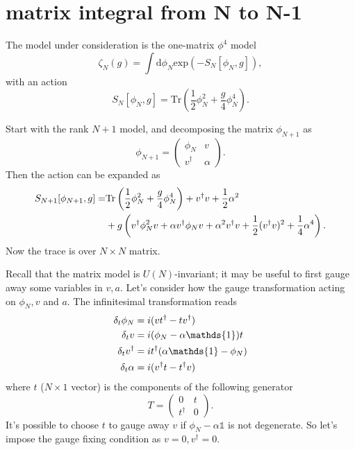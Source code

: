 \section{matrix integral from N to N-1}

The model under consideration is the one-matrix $\phi^4$ model
\begin{equation}
    \zeta_N(g) = \int \mathrm{d}\phi_N \mathrm{exp}(-S_N[\phi_N,g]),
\end{equation}
with an action
\begin{equation}
    S_N[\phi_N,g] = \mathrm{Tr} (\frac{1}{2}\phi_N^2 + \frac{g}{4}\phi_N^4).
\end{equation}

Start with the rank $N+1$ model, and decomposing the matrix $\phi_{N+1}$ as
\begin{equation}
    \phi_{N+1} = \begin{pmatrix}
\phi_N & v\\ 
 v^\dagger & \alpha
\end{pmatrix}.
\end{equation}
Then the action can be expanded as
\begin{align}
	S_{N+1}[\phi_{N+1},g] = &\mathrm{Tr}\left( \frac{1}{2}\phi_N^2+\frac{g}{4}\phi_N^4\right) + v^\dagger v + \frac{1}{2}\alpha^2 \notag \\
	&+ g\left( v^\dagger \phi_N^2 v + \alpha v^\dagger \phi_N v + \alpha^2v^\dagger v + \frac{1}{2}(v^\dagger v)^2 + \frac{1}{4}\alpha^4\right ).
\end{align}
Now the trace is over $N\times N$ matrix.

Recall that the matrix model is $U(N)$-invariant;
it may be useful to first gauge away some variables in $v,a$.
Let's consider how the gauge transformation acting on $\phi_N, v$ and $a$.
The infinitesimal transformation reads
\begin{align}
    \delta_t\phi_N &= i (vt^\dagger - tv^\dagger) \notag\\
	\delta_t v &= i(\phi_N - \alpha\mathds{1})t\notag\\
\delta_t v^\dagger &= it^\dagger (\alpha\mathds{1}-\phi_N) \notag\\
\delta_t \alpha &= i(v^\dagger t - t^\dagger v)
\end{align}
where $t$ ($N\times 1$ vector) is the components of the following generator
\[
 T = \begin{pmatrix}
	 0 & t \\
	 t^\dagger & 0
 \end{pmatrix}
.\] 
It's possible to choose $t$ to gauge away $v$ if $\phi_N - \alpha \mathds{1}$ is not degenerate.
So let's impose the gauge fixing condition as $v=0,v^\dagger=0$.

